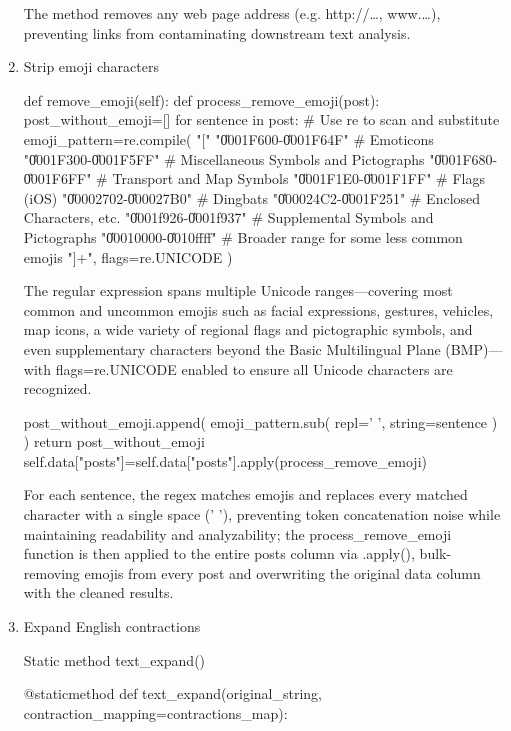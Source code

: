 \documentclass[12pt]{article}
\numberwithin{figure}{section}  %
\begin{document}
\begin{enumerate}
\begin{python}
\end{python}
The method removes any web page address (e.g. http://…, www.…), preventing links from contaminating downstream text analysis.

\item Strip emoji characters
\begin{python}
    def remove_emoji(self):
        def process_remove_emoji(post):
            post_without_emoji=[]
            for sentence in post:
                # Use re to scan and substitute
                emoji_pattern=re.compile(
        "["
        "\U0001F600-\U0001F64F"  # Emoticons
        "\U0001F300-\U0001F5FF"  # Miscellaneous Symbols and Pictographs
        "\U0001F680-\U0001F6FF"  # Transport and Map Symbols
        "\U0001F1E0-\U0001F1FF"  # Flags (iOS)
        "\U00002702-\U000027B0"  # Dingbats
        "\U000024C2-\U0001F251"  # Enclosed Characters, etc.
        "\U0001f926-\U0001f937"  # Supplemental Symbols and Pictographs
        "\U00010000-\U0010ffff"  # Broader range for some less common emojis
        "]+", flags=re.UNICODE
                )

\end{python}

The regular expression spans multiple Unicode ranges—covering most common and uncommon emojis such as facial expressions, gestures, vehicles, map icons, a wide variety of regional flags and pictographic symbols, and even supplementary characters beyond the Basic Multilingual Plane (BMP)—with flags=re.UNICODE enabled to ensure all Unicode characters are recognized.
\begin{python}
                post_without_emoji.append(
                    emoji_pattern.sub(
                        repl=' ',
                        string=sentence
                    )
                )
            return post_without_emoji
        self.data["posts"]=self.data["posts"].apply(process_remove_emoji)

\end{python}
For each sentence, the regex matches emojis and replaces every matched character with a single space (' '), preventing token concatenation noise while maintaining readability and analyzability; the process\_remove\_emoji function is then applied to the entire posts column via .apply(), bulk-removing emojis from every post and overwriting the original data column with the cleaned results.
\item Expand English contractions

Static method text\_expand()
\begin{python}
@staticmethod
def text_expand(original_string, contraction_mapping=contractions_map):
\end{python}


\end{enumerate}
\end{document}
